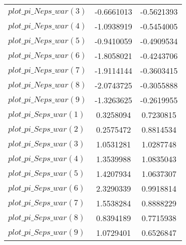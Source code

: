 \begin{center}
\begin{longtable}{lcc}
$plot\_pi\_N eps\_war (3)   $	 & 	     -0.6661013	 & 	     -0.5621393 \\ 
$plot\_pi\_N eps\_war (4)   $	 & 	     -1.0938919	 & 	     -0.5454005 \\ 
$plot\_pi\_N eps\_war (5)   $	 & 	     -0.9410059	 & 	     -0.4909534 \\ 
$plot\_pi\_N eps\_war (6)   $	 & 	     -1.8058021	 & 	     -0.4243706 \\ 
$plot\_pi\_N eps\_war (7)   $	 & 	     -1.9114144	 & 	     -0.3603415 \\ 
$plot\_pi\_N eps\_war (8)   $	 & 	     -2.0743725	 & 	     -0.3055888 \\ 
$plot\_pi\_N eps\_war (9)   $	 & 	     -1.3263625	 & 	     -0.2619955 \\ 
$plot\_pi\_S eps\_war (1)   $	 & 	      0.3258094	 & 	      0.7230815 \\ 
$plot\_pi\_S eps\_war (2)   $	 & 	      0.2575472	 & 	      0.8814534 \\ 
$plot\_pi\_S eps\_war (3)   $	 & 	      1.0531281	 & 	      1.0287748 \\ 
$plot\_pi\_S eps\_war (4)   $	 & 	      1.3539988	 & 	      1.0835043 \\ 
$plot\_pi\_S eps\_war (5)   $	 & 	      1.4207934	 & 	      1.0637307 \\ 
$plot\_pi\_S eps\_war (6)   $	 & 	      2.3290339	 & 	      0.9918814 \\ 
$plot\_pi\_S eps\_war (7)   $	 & 	      1.5538284	 & 	      0.8888229 \\ 
$plot\_pi\_S eps\_war (8)   $	 & 	      0.8394189	 & 	      0.7715938 \\ 
$plot\_pi\_S eps\_war (9)   $	 & 	      1.0729401	 & 	      0.6526847 \\ 
\end{longtable}
 \end{center}
